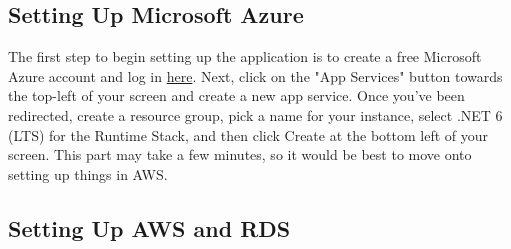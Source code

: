 \documentclass[12pt]{article}
\begin{document}
		\subsection{Setting Up Microsoft Azure}
			The first step to begin setting up the application is to create a free Microsoft Azure account and log in \href{https://azure.microsoft.com/en-us/}{here}. Next, click on the "App Services" button towards the top-left of your screen and create a new app service. Once you've been redirected, create a resource group, pick a name for your instance, select .NET 6 (LTS) for the Runtime Stack, and then click Create at the bottom left of your screen. This part may take a few minutes, so it would be best to move onto setting up things in AWS.
			
		\subsection{Setting Up AWS and RDS}
\end{document}
